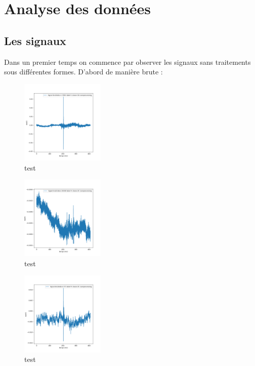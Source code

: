 \hypertarget{Analyse des donnees}{%
\chapter{Analyse des données}\label{Analyse des données}}

\section{Les signaux}

Dans un premier temps on commence par observer les signaux sans traitements sous différentes formes.\n
D'abord de manière brute :

\begin{figure}[!h]
\centering
\includegraphics[width=4cm]{./images/indice17000Spectro1Dlabel0classeGGsansprocessingsanszoom.png}
\caption{test}
\end{figure}


\begin{figure}[!h]
\centering
\includegraphics[width=4cm]{./images/indice20000Spectro1Dlabel9classeZCsansprocessingsanszoom.png}
\caption{test}
\end{figure}

\begin{figure}[!h]
\centering
\includegraphics[width=4cm]{./images/indice571Spectro1Dlabel9classeZCsansprocessingsanszoom.png}
\caption{test}
\end{figure}

